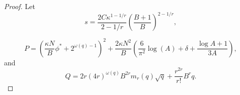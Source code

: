 \documentclass[12pt]{amsart}
\theoremstyle{plain}
\theoremstyle{definition}
\newtheorem{definition}[theorem]{Definition}
\begin{document}
\begin{proof}

 
Let
\begin{equation}\label{eq s}
   s=\frac{2C\kappa^{1-1/r}}{2-1/r}\left(\frac{B+1}{B}\right)^{2-1/r},
\end{equation}

\begin{equation*}
    P
    =
    \left(\frac{\kappa N}{B}\phi^*+2^{\omega(q)-1}\right)^2 + \frac{2\kappa N^2}{B}\left(\frac{6}{\pi^2}\log{(A)}+\delta+\frac{\log{A}+1}{3A}\right),
\end{equation*}
and
\begin{equation*}    
    Q
    =
    2r(4r)^{\omega(q)} B^{2r}m_r(q)\sqrt{q} + \frac{r^{2r}}{r!} B^r q.
\end{equation*}


\end{proof}
\end{document}
